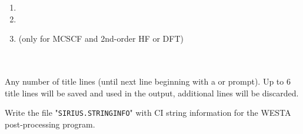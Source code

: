 \begin{description}
\begin{enumerate}
\item \hspace{2em} 

\item \hspace{2em} 

\item \hspace{2em}  (only for MCSCF and 2nd-order HF or DFT)
\end{enumerate}

\item[\Key{TITLE}]  \ \\
   \ \\ 
  Any number of title lines (until next line beginning with a
   or \quotekw{*} prompt).
  Up to 6 title lines will be saved and used in the output, additional
  lines will be discarded.

\item[\Key{WESTA}]
  Write the file "\verb|SIRIUS.STRINGINFO|" with CI string information for the WESTA post-processing program.

\end{description}




\pagebreak[3]
\subsection{\label{ref-auxinp}}

